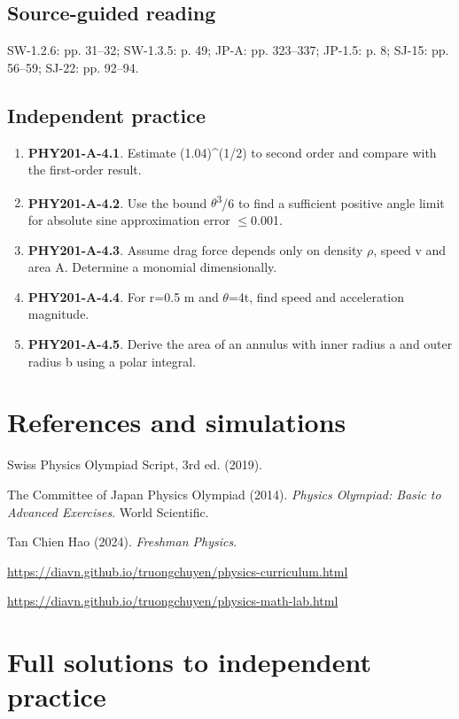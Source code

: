 \documentclass[11pt,a4paper,openany]{book}
\begin{document}
\section{Source-guided reading}
SW-1.2.6: pp. 31–32; SW-1.3.5: p. 49; JP-A: pp. 323–337; JP-1.5: p. 8; SJ-15: pp. 56–59; SJ-22: pp. 92–94.
\section{Independent practice}
\begin{enumerate}
\item \textbf{PHY201-A-4.1}. Estimate (1.04)^(1/2) to second order and compare with the first-order result.
\item \textbf{PHY201-A-4.2}. Use the bound \ensuremath{\theta}\textsuperscript{3}/6 to find a sufficient positive angle limit for absolute sine approximation error \ensuremath{\le}0.001.
\item \textbf{PHY201-A-4.3}. Assume drag force depends only on density \ensuremath{\rho}, speed v and area A. Determine a monomial dimensionally.
\item \textbf{PHY201-A-4.4}. For r=0.5 m and \ensuremath{\theta}=4t, find speed and acceleration magnitude.
\item \textbf{PHY201-A-4.5}. Derive the area of an annulus with inner radius a and outer radius b using a polar integral.
\end{enumerate}
\chapter*{References and simulations}
Swiss Physics Olympiad Script, 3rd ed. (2019).\par
The Committee of Japan Physics Olympiad (2014). \textit{Physics Olympiad: Basic to Advanced Exercises}. World Scientific.\par
Tan Chien Hao (2024). \textit{Freshman Physics}.\par
\url{https://diavn.github.io/truongchuyen/physics-curriculum.html}\par
\url{https://diavn.github.io/truongchuyen/physics-math-lab.html}
\appendix
\chapter{Full solutions to independent practice}
\end{document}
